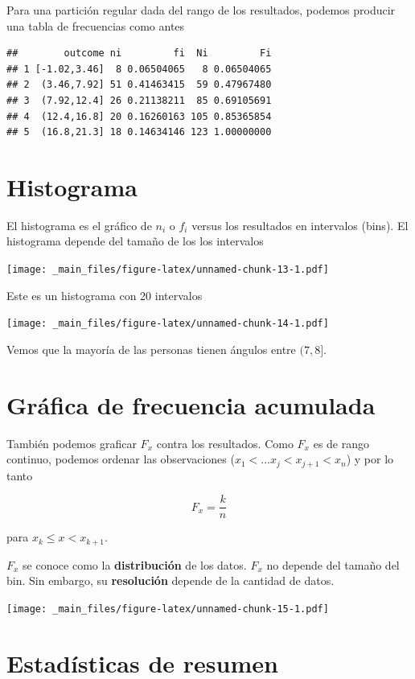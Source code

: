 \documentclass[
]{book}
\begin{document}
Para una partición regular dada del rango de los resultados, podemos producir una tabla de frecuencias como antes

\begin{verbatim}
##        outcome ni         fi  Ni         Fi
## 1 [-1.02,3.46]  8 0.06504065   8 0.06504065
## 2  (3.46,7.92] 51 0.41463415  59 0.47967480
## 3  (7.92,12.4] 26 0.21138211  85 0.69105691
## 4  (12.4,16.8] 20 0.16260163 105 0.85365854
## 5  (16.8,21.3] 18 0.14634146 123 1.00000000
\end{verbatim}

\hypertarget{histograma}{%
\section{Histograma}\label{histograma}}

El histograma es el gráfico de \(n_i\) o \(f_i\) versus los resultados en intervalos (bins). El histograma depende del tamaño de los los intervalos

\texttt{[image: \_main\_files/figure-latex/unnamed-chunk-13-1.pdf]}

Este es un histograma con 20 intervalos

\texttt{[image: \_main\_files/figure-latex/unnamed-chunk-14-1.pdf]}

Vemos que la mayoría de las personas tienen ángulos entre \((7, 8]\).

\hypertarget{gruxe1fica-de-frecuencia-acumulada-1}{%
\section{Gráfica de frecuencia acumulada}\label{gruxe1fica-de-frecuencia-acumulada-1}}

También podemos graficar \(F_x\) contra los resultados. Como \(F_x\) es de rango continuo, podemos ordenar las observaciones (\(x_1 <... x_j < x_{j+1} < x_n\)) y por lo tanto

\[F_x = \frac{k}{n}\]

para \(x_{k} \leq x < x_{k+1}\).

\(F_x\) se conoce como la \textbf{distribución} de los datos. \(F_x\) no depende del tamaño del bin. Sin embargo, su \textbf{resolución} depende de la cantidad de datos.

\texttt{[image: \_main\_files/figure-latex/unnamed-chunk-15-1.pdf]}

\hypertarget{estaduxedsticas-de-resumen}{%
\section{Estadísticas de resumen}\label{estaduxedsticas-de-resumen}}
\end{document}
